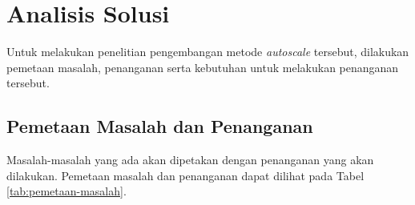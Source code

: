 \section{Analisis Solusi}

Untuk melakukan penelitian pengembangan metode \textit{autoscale} tersebut, dilakukan pemetaan masalah, penanganan serta kebutuhan untuk melakukan penanganan tersebut.

\subsection{Pemetaan Masalah dan Penanganan}
\label{sec:pemetaan-masalah}
Masalah-masalah yang ada akan dipetakan dengan penanganan yang akan dilakukan. Pemetaan masalah dan penanganan dapat dilihat pada Tabel \ref{tab:pemetaan-masalah}.

